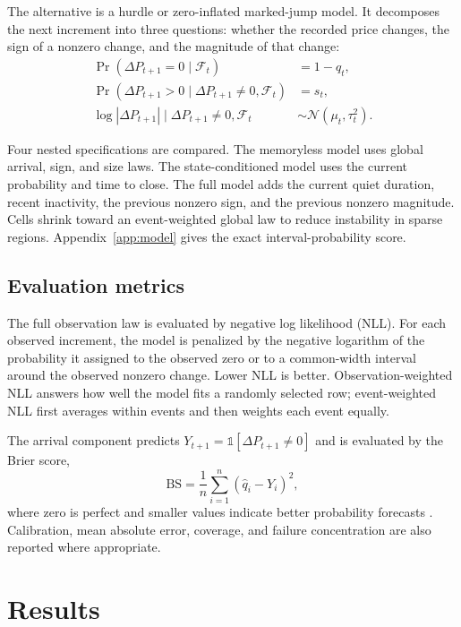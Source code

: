 \documentclass[11pt]{article}
\newcommand{\ind}{\mathbb{1}}
\begin{document}
The alternative is a hurdle or zero-inflated marked-jump model. It decomposes the next increment
into three questions: whether the recorded price changes, the sign of a nonzero change, and the
magnitude of that change:
\begin{align}
\Pr(\Delta P_{t+1}=0\mid\mathcal F_t) &= 1-q_t, \label{eq:arrival}\\
\Pr(\Delta P_{t+1}>0\mid\Delta P_{t+1}\neq0,\mathcal F_t) &= s_t, \label{eq:sign}\\
\log|\Delta P_{t+1}|\mid\Delta P_{t+1}\neq0,\mathcal F_t
&\sim \mathcal N(\mu_t,\tau_t^2). \label{eq:size}
\end{align}

Four nested specifications are compared. The memoryless model uses global arrival, sign, and size
laws. The state-conditioned model uses the current probability and time to close. The full model
adds the current quiet duration, recent inactivity, the previous nonzero sign, and the previous
nonzero magnitude. Cells shrink toward an event-weighted global law to reduce instability in
sparse regions. Appendix~\ref{app:model} gives the exact interval-probability score.

\subsection{Evaluation metrics}

The full observation law is evaluated by negative log likelihood (NLL). For each observed
increment, the model is penalized by the negative logarithm of the probability it assigned to the
observed zero or to a common-width interval around the observed nonzero change. Lower NLL is
better. Observation-weighted NLL answers how well the model fits a randomly selected row;
event-weighted NLL first averages within events and then weights each event equally.

The arrival component predicts $Y_{t+1}=\ind[\Delta P_{t+1}\neq0]$ and is evaluated by the Brier
score,
\begin{equation}
\mathrm{BS}=\frac{1}{n}\sum_{i=1}^{n}(\widehat q_i-Y_i)^2,
\label{eq:brier}
\end{equation}
where zero is perfect and smaller values indicate better probability forecasts
\cite{brier1950}. Calibration, mean absolute error, coverage, and failure concentration are also
reported where appropriate.

\section{Results}
\end{document}
